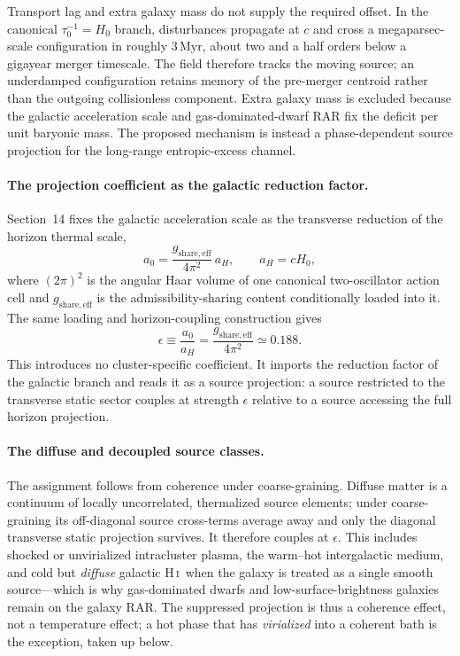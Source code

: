 \documentclass[11pt]{article}
\begin{document}
Transport lag and extra galaxy mass do not supply the required offset. In the canonical $\tau_0^{-1}=H_0$ branch, disturbances propagate at $c$ and cross a megaparsec-scale configuration in roughly $3\,\mathrm{Myr}$, about two and a half orders below a gigayear merger timescale. The field therefore tracks the moving source; an underdamped configuration retains memory of the pre-merger centroid rather than the outgoing collisionless component. Extra galaxy mass is excluded because the galactic acceleration scale and gas-dominated-dwarf RAR fix the deficit per unit baryonic mass. The proposed mechanism is instead a phase-dependent source projection for the long-range entropic-excess channel.

\paragraph{The projection coefficient as the galactic reduction factor.}
Section~14 fixes the galactic acceleration scale as the transverse reduction of the horizon thermal scale,
\[
a_0=\frac{g_{\mathrm{share,eff}}}{4\pi^2}\,a_H,
\qquad
a_H=cH_0 ,
\]
where $(2\pi)^2$ is the angular Haar volume of one canonical two-oscillator action cell and $g_{\mathrm{share,eff}}$ is the admissibility-sharing content conditionally loaded into it. The same loading and horizon-coupling construction gives
\[
\epsilon
\equiv
\frac{a_0}{a_H}
=
\frac{g_{\mathrm{share,eff}}}{4\pi^2}
\simeq 0.188 .
\]
This introduces no cluster-specific coefficient. It imports the reduction factor of the galactic branch and reads it as a source projection: a source restricted to the transverse static sector couples at strength $\epsilon$ relative to a source accessing the full horizon projection.

\paragraph{The diffuse and decoupled source classes.}
The assignment follows from coherence under coarse-graining. Diffuse matter is a continuum of locally uncorrelated, thermalized source elements; under coarse-graining its off-diagonal source cross-terms average away and only the diagonal transverse static projection survives. It therefore couples at $\epsilon$. This includes shocked or unvirialized intracluster plasma, the warm--hot intergalactic medium, and cold but \emph{diffuse} galactic H\,\textsc{i}\ when the galaxy is treated as a single smooth source---which is why gas-dominated dwarfs and low-surface-brightness galaxies remain on the galaxy RAR. The suppressed projection is thus a coherence effect, not a temperature effect; a hot phase that has \emph{virialized} into a coherent bath is the exception, taken up below.
\end{document}
